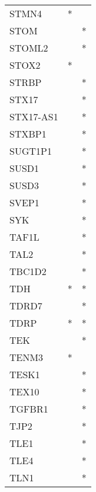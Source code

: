 \begin{longtable}{lcc}
STMN4                 &              * &            \\
STOM                  &                &          * \\
STOML2                &                &          * \\
STOX2                 &              * &            \\
STRBP                 &                &          * \\
STX17                 &                &          * \\
STX17-AS1             &                &          * \\
STXBP1                &                &          * \\
SUGT1P1               &                &          * \\
SUSD1                 &                &          * \\
SUSD3                 &                &          * \\
SVEP1                 &                &          * \\
SYK                   &                &          * \\
TAF1L                 &                &          * \\
TAL2                  &                &          * \\
TBC1D2                &                &          * \\
TDH                   &              * &          * \\
TDRD7                 &                &          * \\
TDRP                  &              * &          * \\
TEK                   &                &          * \\
TENM3                 &              * &            \\
TESK1                 &                &          * \\
TEX10                 &                &          * \\
TGFBR1                &                &          * \\
TJP2                  &                &          * \\
TLE1                  &                &          * \\
TLE4                  &                &          * \\
TLN1                  &                &          * \\

\end{longtable}
